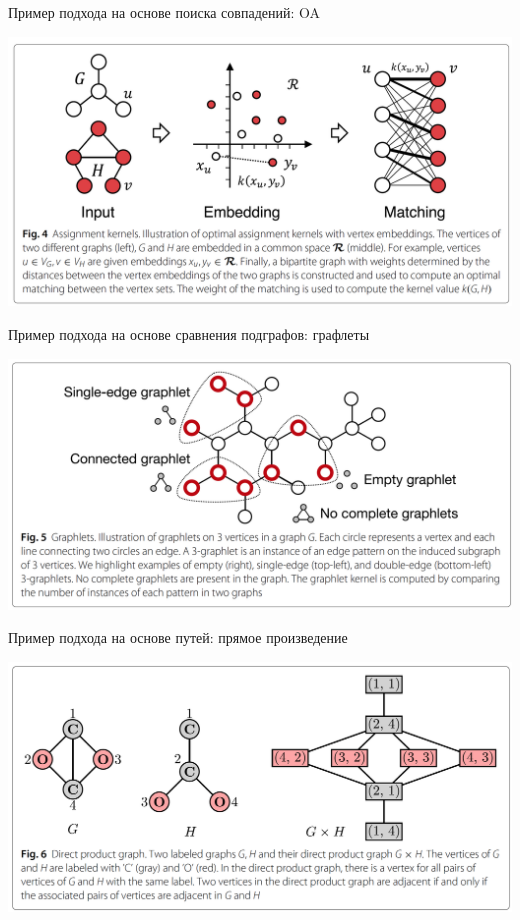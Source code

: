 \documentclass{beamer}
\begin{document}
\begin{frame}{Пример подхода на основе поиска совпадений: OA}
	\begin{center}
		\includegraphics[width=\textwidth]{oa}
	\end{center}
	
\end{frame}

\begin{frame}{Пример подхода на основе сравнения подграфов: графлеты}
	\begin{center}
		\includegraphics[width=\textwidth]{graphlet}
	\end{center}
	
\end{frame}

\begin{frame}{Пример подхода на основе путей: прямое произведение}
	\begin{center}
		\includegraphics[width=\textwidth]{direct_prod}
	\end{center}
	
\end{frame}
 
\end{document}
